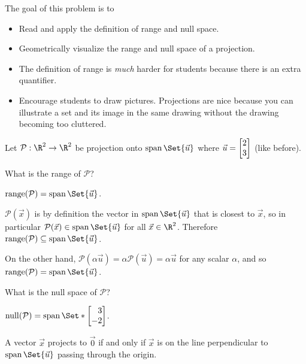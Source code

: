 	\question
	\begin{annotation}
		\begin{goals}

			The goal of this problem is to
			\begin{itemize}
				\item Read and apply the definition of range and null space.
				\item Geometrically visualize the range and null space of a projection.
			\end{itemize}
		\end{goals}

		\begin{notes}
			\begin{itemize}
				\item The definition of range is \emph{much} harder for students
					because there is an extra quantifier.
				\item Encourage students to draw pictures. Projections are nice because you can illustrate
					a set and its image in the same drawing without the drawing becoming too cluttered.
			\end{itemize}
		\end{notes}
	\end{annotation}
	Let $\mathcal P:\R^2\to\R^2$ be projection onto $\Span\Set{\vec u}$ where
	$\vec u=\mat{2\\3}$ (like before).
	\begin{parts}
		\item What is the range of $\mathcal P$?
			\begin{solution}
				$\Range(\mathcal P)=\Span\Set{\vec u}$.

				$\mathcal P(\vec x)$ is by definition the vector in $\Span\Set{\vec u}$
				that is closest to $\vec x$, so in particular
				$\mathcal P(\vec x) \in \Span\Set{\vec u}$ for all $\vec x\in\R^2$.
				Therefore $\Range(\mathcal P)\subseteq\Span\Set{\vec u}$.

				On the other hand, $\mathcal P(\alpha \vec u)=\alpha\mathcal P(\vec u)=\alpha\vec u$
				for any scalar $\alpha$, and so $\Range(\mathcal P)=\Span\Set{\vec u}$.
			\end{solution}
		\item What is the null space of $\mathcal P$?
			\begin{solution}
				\begin{solution}
					$\Null(\mathcal P)=\Span\Set*{\mat{3\\-2}}$.

					A vector $\vec x$ projects to $\vec 0$ if and only if $\vec x$
					is on the line perpendicular to $\Span\Set{\vec u}$ passing
					through the origin.
				\end{solution}
			\end{solution}
	\end{parts}

